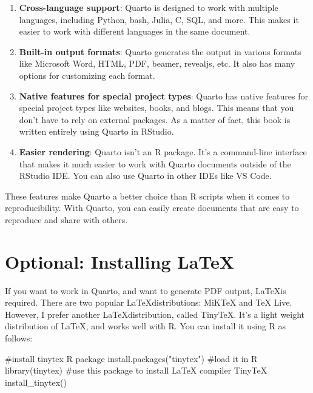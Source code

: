 \documentclass[
  letterpaper,
  paper =a4,
  twoside,
  openright,
  headsepline,
  footsepline,
  listof = totocnumbered,
  chapterprefix = true,
  firstiscover,
  parskip = full*]{scrbook}
\newenvironment{Shaded}{\begin{snugshade}}{\end{snugshade}}
\newcommand{\CommentTok}[1]{\textcolor[rgb]{0.37,0.37,0.37}{#1}}
\newcommand{\FunctionTok}[1]{\textcolor[rgb]{0.28,0.35,0.67}{#1}}
\newcommand{\NormalTok}[1]{\textcolor[rgb]{0.00,0.23,0.31}{#1}}
\newcommand{\StringTok}[1]{\textcolor[rgb]{0.13,0.47,0.30}{#1}}
\begin{document}
\begin{enumerate}
\def\labelenumi{\arabic{enumi}.}
\item
  \textbf{Cross-language support}: Quarto is designed to work with
  multiple languages, including Python, bash, Julia, C, SQL, and more.
  This makes it easier to work with different languages in the same
  document.
\item
  \textbf{Built-in output formats}: Quarto generates the output in
  various formats like Microsoft Word, HTML, PDF, beamer, revealjs, etc.
  It also has many options for customizing each format.
\item
  \textbf{Native features for special project types}: Quarto has native
  features for special project types like websites, books, and blogs.
  This means that you don't have to rely on external packages. As a
  matter of fact, this book is written entirely using Quarto in RStudio.
\item
  \textbf{Easier rendering}: Quarto isn't an R package. It's a
  command-line interface that makes it much easier to work with Quarto
  documents outside of the RStudio IDE. You can also use Quarto in other
  IDEs like VS Code.
\end{enumerate}

These features make Quarto a better choice than R scripts when it comes
to reproducibility. With Quarto, you can easily create documents that
are easy to reproduce and share with others.

\section{\texorpdfstring{Optional: Installing
\LaTeX}{Optional: Installing }}\label{optional-installing}

If you want to work in Quarto, and want to generate PDF output,
\LaTeX is required. There are two popular \LaTeX distributions: MiKTeX
and TeX Live. However, I prefer another \LaTeX distribution, called
TinyTeX. It's a light weight distribution of \LaTeX, and works well with
R. You can install it using R as follows:

\begin{Shaded}
\begin{Highlighting}[]
\CommentTok{\#install tinytex R package}
\FunctionTok{install.packages}\NormalTok{(}\StringTok{"tinytex"}\NormalTok{)}
\CommentTok{\#load it in R}
\FunctionTok{library}\NormalTok{(tinytex)}
\CommentTok{\#use this package to install LaTeX compiler TinyTeX}
\FunctionTok{install\_tinytex}\NormalTok{()}
\end{Highlighting}
\end{Shaded}
\end{document}
